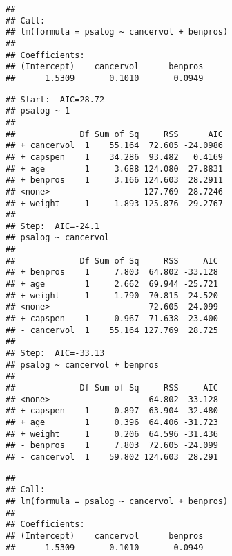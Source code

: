 \begin{knitrout}
\begin{kframe}
\begin{verbatim}
##
## Call:
## lm(formula = psalog ~ cancervol + benpros)
##
## Coefficients:
## (Intercept)    cancervol      benpros
##      1.5309       0.1010       0.0949
\end{verbatim}
\begin{alltt}
 \hlkwb{<-}
    \hlstd{(} \hlopt{~} \hlstd{),}
     \hlstd{=} \hlstd{(} \hlstd{=} \hlopt{~}\hlstd{,}
                  \hlstd{=} \hlopt{~}  \hlopt{+}  \hlopt{+}  \hlopt{+}  \hlopt{+} 
     \hlstd{=} \hlstd{)}
\end{alltt}
\begin{verbatim}
## Start:  AIC=28.72
## psalog ~ 1
##
##             Df Sum of Sq     RSS      AIC
## + cancervol  1    55.164  72.605 -24.0986
## + capspen    1    34.286  93.482   0.4169
## + age        1     3.688 124.080  27.8831
## + benpros    1     3.166 124.603  28.2911
## <none>                   127.769  28.7246
## + weight     1     1.893 125.876  29.2767
##
## Step:  AIC=-24.1
## psalog ~ cancervol
##
##             Df Sum of Sq     RSS     AIC
## + benpros    1     7.803  64.802 -33.128
## + age        1     2.662  69.944 -25.721
## + weight     1     1.790  70.815 -24.520
## <none>                    72.605 -24.099
## + capspen    1     0.967  71.638 -23.400
## - cancervol  1    55.164 127.769  28.725
##
## Step:  AIC=-33.13
## psalog ~ cancervol + benpros
##
##             Df Sum of Sq     RSS     AIC
## <none>                    64.802 -33.128
## + capspen    1     0.897  63.904 -32.480
## + age        1     0.396  64.406 -31.723
## + weight     1     0.206  64.596 -31.436
## - benpros    1     7.803  72.605 -24.099
## - cancervol  1    59.802 124.603  28.291
\end{verbatim}
\begin{alltt}
\end{alltt}
\begin{verbatim}
##
## Call:
## lm(formula = psalog ~ cancervol + benpros)
##
## Coefficients:
## (Intercept)    cancervol      benpros
##      1.5309       0.1010       0.0949
\end{verbatim}
\begin{alltt}
 \hlkwb{<-} \hlstd{(}  \hlopt{~}  \hlopt{+} 


\end{alltt}
\end{kframe}
\end{knitrout}
